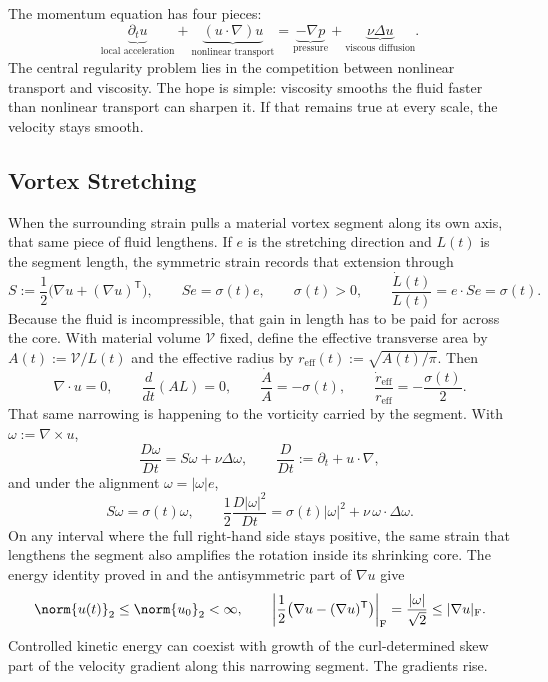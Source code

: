 
The momentum equation has four pieces:
\[
  \underbrace{\partial_t u}_{\text{local acceleration}}
  +
  \underbrace{(u\cdot\nabla)u}_{\text{nonlinear transport}}
  =
  \underbrace{-\nabla p}_{\text{pressure}}
  +
  \underbrace{\nu\Delta u}_{\text{viscous diffusion}}.
\]
The central regularity problem lies in the competition between nonlinear transport and viscosity.
The hope is simple: viscosity smooths the fluid faster than nonlinear transport can sharpen it.
If that remains true at every scale, the velocity stays smooth.

\subsection{Vortex Stretching}\label{sub:ThePerfectlyStretchingVortex}

When the surrounding strain pulls a material vortex segment along its own axis, that same piece of fluid lengthens. If \(e\) is the stretching direction and \(L(t)\) is the segment length, the symmetric strain records that extension through
\[
  S:=\frac12\bigl(\nabla u+(\nabla u)^{\mathsf T}\bigr),
  \qquad
  Se=\sigma(t)e,
  \qquad
  \sigma(t)>0,
  \qquad
  \frac{\dot L(t)}{L(t)}
  =
  e\cdot Se
  =
  \sigma(t).
\]
Because the fluid is incompressible, that gain in length has to be paid for across the core. With material volume \(\mathcal V\) fixed, define the effective transverse area by \(A(t):=\mathcal V/L(t)\) and the effective radius by \(r_{\mathrm{eff}}(t):=\sqrt{A(t)/\pi}\). Then
\[
  \nabla\cdot u=0,
  \qquad
  \frac{d}{dt}(A L)=0,
  \qquad
  \frac{\dot A}{A}=-\sigma(t),
  \qquad
  \frac{\dot r_{\mathrm{eff}}}{r_{\mathrm{eff}}}
  =
  -\frac{\sigma(t)}{2}.
\]
That same narrowing is happening to the vorticity carried by the segment. With \(\omega:=\nabla\times u\),
\[
  \frac{D\omega}{Dt}
  =
  S\omega+\nu\Delta\omega,
  \qquad
  \frac{D}{Dt}
  :=
  \partial_t+u\cdot\nabla,
\]
and under the alignment \(\omega=|\omega|e\),
\[
  S\omega
  =
  \sigma(t)\omega,
  \qquad
  \frac12\frac{D|\omega|^2}{Dt}
  =
  \sigma(t)|\omega|^2
  +
  \nu\,\omega\cdot\Delta\omega.
\]
On any interval where the full right-hand side stays positive, the same strain that lengthens the segment also amplifies the rotation inside its shrinking core. The energy identity proved in  and the antisymmetric part of \(\nabla u\) give
\[
  \norm{u(t)}_2
  \leq
  \norm{u_0}_2
  <\infty,
  \qquad
  \left|\frac12\bigl(\nabla u-(\nabla u)^{\mathsf T}\bigr)\right|_{\mathrm F}
  =
  \frac{|\omega|}{\sqrt2}
  \leq
  |\nabla u|_{\mathrm F}.
\]
Controlled kinetic energy can coexist with growth of the curl-determined skew part of the velocity gradient along this narrowing segment. The gradients rise.

